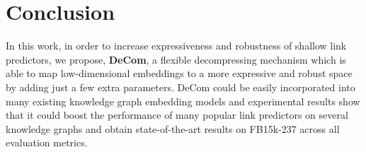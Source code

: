 \documentclass[letterpaper]{article} \usepackage{aaai20}  \usepackage{times}  \usepackage{helvet} \usepackage{courier}  \usepackage{booktabs}
\begin{document}
\section{Conclusion}
 In this work, in order to increase expressiveness and robustness of shallow link predictors, we propose, \textbf{DeCom}, a flexible decompressing mechanism which is able to map low-dimensional embeddings to a more expressive and robust space by adding just a few extra parameters.  DeCom could be easily incorporated into many existing knowledge graph embedding models and experimental results show that it could boost the performance of many popular link predictors on several knowledge graphs and obtain state-of-the-art results on FB15k-237 across all evaluation metrics.
\newpage


\end{document}
